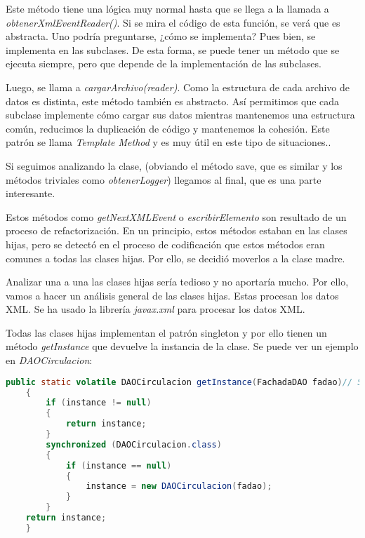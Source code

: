 Este método tiene una lógica muy normal hasta que se llega a la llamada a \textit{obtenerXmlEventReader()}.
Si se mira el código de esta función, se verá que es abstracta.
Uno podría preguntarse, ¿cómo se implementa?
Pues bien, se implementa en las subclases.
De esta forma, se puede tener un método que se ejecuta siempre, pero que depende de la implementación de las subclases.

Luego, se llama a \textit{cargarArchivo(reader)}.
Como la estructura de cada archivo de datos es distinta, este método también es abstracto.
Así permitimos que cada subclase implemente cómo cargar sus datos mientras mantenemos una estructura
común, reducimos la duplicación de código y mantenemos la cohesión.
Este patrón se llama \textit{Template Method} y es muy útil en este tipo de situaciones.\autocite{digitalocean2024templatemethod}.\par

Si seguimos analizando la clase, (obviando el método save, que es similar y los métodos triviales como \textit{obtenerLogger})
llegamos al final, que es una parte interesante.

Estos métodos como \textit{getNextXMLEvent} o \textit{escribirElemento}
son resultado de un proceso de refactorización.
En un principio, estos métodos estaban en las clases hijas, pero
se detectó en el proceso de codificación que estos métodos eran comunes a todas las clases hijas.
Por ello, se decidió moverlos a la clase madre.\par

Analizar una a una las clases hijas sería tedioso y no aportaría mucho.
Por ello, vamos a hacer un análisis general de las clases hijas.
Estas procesan los datos XML\@.
Se ha usado la librería \textit{javax.xml} para procesar los datos XML\@.

Todas las clases hijas implementan el patrón singleton y por ello tienen
un método \textit{getInstance} que devuelve la instancia de la clase.
Se puede ver un ejemplo en \textit{DAOCirculacion}:
\begin{lstlisting}[language=Java, caption={Método \textit{getInstance}}, label={lst:getInstance}]
    public static volatile DAOCirculacion getInstance(FachadaDAO fadao)// Singleton
    {
        if (instance != null)
        {
            return instance;
        }
        synchronized (DAOCirculacion.class)
        {
            if (instance == null)
            {
                instance = new DAOCirculacion(fadao);
            }
        }
    return instance;
    }
\end{lstlisting}


